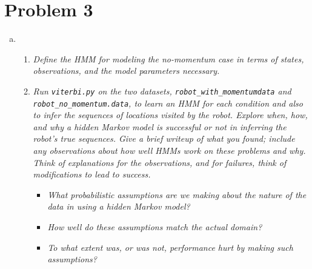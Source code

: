 \documentclass{article}
\begin{document}
\section*{Problem 3}
\begin{enumerate}[(a)]
\setcounter{enumi}2
\item
  \begin{enumerate}
  \item \emph{Define the HMM for modeling the no-momentum case in terms of
    states, observations, and the model parameters necessary.}
  \item \emph{Run \emph{\texttt{viterbi.py}} on the two datasets, \emph{\texttt{robot\_with\_momentumdata}}
    and \emph{\texttt{robot\_no\_momentum.data}}, to learn an HMM for each condition and also
    to infer the sequences of locations visited by the robot. Explore when,
    how, and why a hidden Markov model is successful or not in inferring the
    robot's true sequences. Give a brief writeup of what you found; include any
    observations about how well HMMs work on these problems and why. Think of
    explanations for the observations, and for failures, think of modifications
    to lead to success.}

    \begin{itemize}
    \item \emph{What probabilistic assumptions are we making about the nature of
      the data in using a hidden Markov model?}

    \item \emph{How well do these assumptions match the actual domain?}

    \item \emph{To what extent was, or was not, performance hurt by making such
      assumptions?}

    \end{itemize}
  \end{enumerate}
\end{enumerate}
\end{document}

